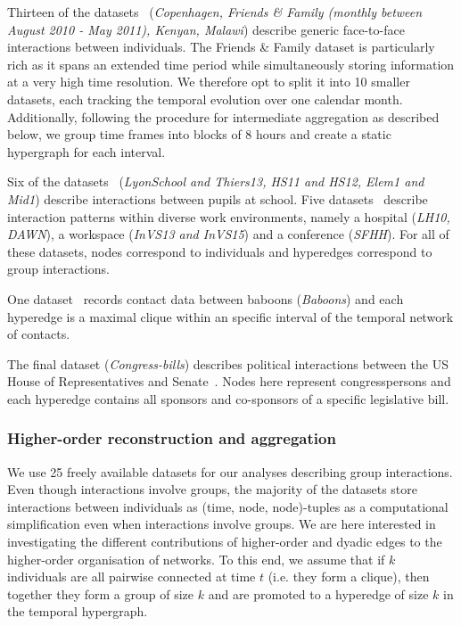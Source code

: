 \documentclass[a4paper,pre,reqno,superscriptaddress, twocolumn, floatfix]{revtex4}
\def\numdatasets{25 }
\def\ho{higher-order }
\begin{document}
Thirteen of the datasets~\cite{sapiezynski2019copenhagen, aharony2011friendsnfamily, kiti2016quantifying, ozella2021malawi}
(\textit{Copenhagen, 
Friends \& Family (monthly between August 2010 - May 2011), 
Kenyan,  
Malawi}) 
describe generic face-to-face interactions between individuals. 
The Friends \& Family dataset is particularly rich as it spans an extended time period while simultaneously storing information at a very high time resolution. We therefore opt to split it into 10 smaller datasets, each tracking the temporal evolution over one calendar month. Additionally, following the procedure for intermediate aggregation as described below, we group time frames into blocks of 8 hours and create a static hypergraph for each interval. 

Six of the datasets~\cite{genois2018sociopatterns, fournet2014highschool, toth2015role} 
(\textit{LyonSchool and Thiers13, 
HS11 and HS12, 
Elem1 and Mid1}) 
describe interactions between pupils at school. 
Five datasets~\cite{genois2018sociopatterns,benson2018simplicial,fowler2006congressbills} describe interaction patterns within diverse work environments, namely a hospital 
(\textit{LH10, DAWN}), 
a workspace 
(\textit{InVS13 and InVS15}) and 
a conference (\textit{SFHH}).
For all of these datasets, nodes correspond to individuals and hyperedges correspond to group interactions.

One dataset~\cite{gelardi2020babboons} records contact data between baboons (\textit{Baboons}) and each hyperedge is a maximal clique within an specific interval of the temporal network of contacts.

The final dataset (\textit{Congress-bills}) describes political interactions between the US House of Representatives and Senate~\cite{fowler2006congressbills}. Nodes here represent congresspersons and each hyperedge contains all sponsors and co-sponsors of a specific legislative bill. 



\subsubsection*{Higher-order reconstruction and aggregation}
\label{sec:meth-horecon-aggr}

We use \numdatasets freely available datasets for our analyses describing group interactions. Even though interactions involve groups, the majority of the datasets store interactions between individuals as (time, node, node)-tuples as a computational simplification even when interactions involve groups. We are here interested in investigating the different contributions of \ho and dyadic edges to the \ho organisation of networks. To this end, we assume that if $k$ individuals are all pairwise connected at time $t$ (i.e. they form a clique), then together they form a group of size $k$ and are promoted to a hyperedge of size $k$ in the temporal hypergraph. 
\end{document}
